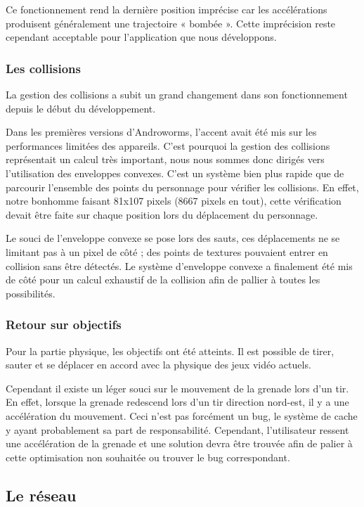 \documentclass{report}
\begin{document}
Ce fonctionnement rend la dernière position imprécise car les 
accélérations produisent généralement une trajectoire « bombée ». Cette 
imprécision reste cependant acceptable pour l’application que nous 
développons.

\subsubsection{Les collisions}
La gestion des collisions a subit un grand changement dans son 
fonctionnement depuis le début du développement.

Dans les premières versions d’Androworms, l’accent avait été mis sur les
performances limitées des appareils. C’est pourquoi la gestion des
collisions représentait un calcul très important, nous nous sommes donc
dirigés vers l’utilisation des enveloppes convexes. C’est un système
bien plus rapide que de parcourir l’ensemble des points du personnage
pour vérifier les collisions. En effet, notre bonhomme faisant 81x107
pixels (8667 pixels en tout), cette vérification devait être faite sur
chaque position lors du déplacement du personnage. 

Le souci de l’enveloppe convexe se pose lors des sauts, ces déplacements
ne se limitant pas à un pixel de côté ; des points de textures pouvaient
entrer en collision sans être détectés. 
Le système d’enveloppe convexe a finalement été mis de côté pour un
calcul exhaustif de la collision afin de pallier à toutes les
possibilités.

\subsubsection{Retour sur objectifs}

Pour la partie physique, les objectifs ont été atteints. Il est possible
de tirer, sauter et se déplacer en accord avec la physique des jeux
vidéo actuels. 

Cependant il existe un léger souci sur le mouvement de la grenade lors
d’un tir. En effet, lorsque la grenade redescend lors d’un tir direction
nord-est, il y a une accélération du mouvement. Ceci n’est pas forcément
un bug, le système de cache y ayant probablement sa part de
responsabilité. Cependant, l’utilisateur ressent une accélération de la
grenade et une solution devra être trouvée afin de palier à cette
optimisation non souhaitée ou trouver le bug correspondant.


\subsection{Le réseau}
\bigskip
\end{document}

